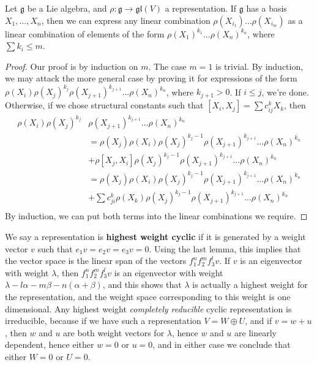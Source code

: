 \begin{lemma}
    Let $\mathfrak{g}$ be a Lie algebra, and $\rho: \mathfrak{g} \to \mathfrak{gl}(V)$ a representation. If $\mathfrak{g}$ has a basis $X_1, \dots, X_n$, then we can express any linear combination $\rho(X_{i_1}) \dots \rho(X_{i_m})$ as a linear combination of elements of the form $\rho(X_1)^{k_1} \dots \rho(X_n)^{k_n}$, where $\sum k_i \leq m$.
\end{lemma}
\begin{proof}
    Our proof is by induction on $m$. The case $m = 1$ is trivial. By induction, we may attack the more general case by proving it for expressions of the form $\rho(X_i) \rho(X_j)^{k_j} \rho(X_{j+1})^{k_{j+1}} \dots \rho(X_n)^{k_n}$, where $k_{j+1} > 0$. If $i \leq j$, we're done. Otherwise, if we chose structural constants such that $[X_i,X_j] = \sum c_{ij}^k X_k$, then
    \begin{align*}
        \rho(X_i) \rho(X_j)^{k_j} &\rho(X_{j+1})^{k_{j+1}} \dots \rho(X_n)^{k_n}\\
        &= \rho(X_j) \rho(X_i) \rho(X_j)^{k_j-1} \rho(X_{j+1})^{k_{j+1}} \dots \rho(X_n)^{k_n}\\
        &+ \rho[X_j, X_i] \rho(X_j)^{k_j - 1} \rho(X_{j+1})^{k_{j+1}} \dots \rho(X_n)^{k_n}\\
        &= \rho(X_j) \rho(X_i) \rho(X_j)^{k_j-1} \rho(X_{j+1})^{k_{j+1}} \dots \rho(X_n)^{k_n}\\
        &+ \sum c_{ji}^k \rho(X_k) \rho(X_j)^{k_j - 1} \rho(X_{j+1})^{k_{j+1}} \dots \rho(X_n)^{k_n}\\
    \end{align*}
    By induction, we can put both terms into the linear combinations we require.
\end{proof}

We say a representation is {\bf highest weight cyclic} if it is generated by a weight vector $v$ such that $e_1v = e_2v = e_3v = 0$. Using the last lemma, this implies that the vector space is the linear span of the vectors $f_1^n f_2^m f_3^l v$. If $v$ is an eigenvector with weight $\lambda$, then $f_1^n f_2^m f_3^l v$ is an eigenvector with weight $\lambda - l \alpha - m \beta - n (\alpha + \beta)$, and this shows that $\lambda$ is actually a highest weight for the representation, and the weight space corresponding to this weight is one dimensional. Any highest weight {\it completely reducible} cyclic representation is irreducible, because if we have such a representation $V = W \oplus U$, and if $v = w + u$, then $w$ and $u$ are both weight vectors for $\lambda$, hence $w$ and $u$ are linearly dependent, hence either $w = 0$ or $u = 0$, and in either case we conclude that either $W = 0$ or $U = 0$.

